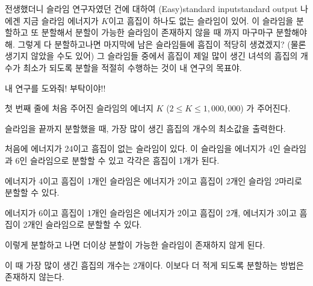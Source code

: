 \begin{problem}{전생했더니 슬라임 연구자였던 건에 대하여 (Easy)}{standard input}{standard output}
나에겐 지금 슬라임 에너지가 $K$이고 흠집이 하나도 없는 슬라임이 있어.
이 슬라임을 분할하고 또 분할해서 분할이 가능한 슬라임이 존재하지 않을 때 까지 마구마구 분할해야해.
그렇게 다 분할하고나면 마지막에 남은 슬라임들에 흠집이 적당히 생겼겠지?
(물론 생기지 않았을 수도 있어)
그 슬라임들 중에서 흠집이 제일 많이 생긴 녀석의 흠집의 개수가 최소가 되도록
분할을 적절히 수행하는 것이 내 연구의 목표야.

내 연구를 도와줘! 부탁이야!!

\InputFile
첫 번째 줄에 처음 주어진 슬라임의 에너지 $K$ ($2 \le K \le 1,000,000$) 가 주어진다.

\OutputFile
슬라임을 끝까지 분할했을 때, 가장 많이 생긴 흠집의 개수의 최소값을 출력한다.

\Example

\begin{example}
%
%
%
\end{example}

\Notes
처음에 에너지가 24이고 흠집이 없는 슬라임이 있다.
이 슬라임을 에너지가 4인 슬라임과 6인 슬라임으로 분할할 수 있고 각각은 흠집이 1개가 된다.

에너지가 4이고 흠집이 1개인 슬라임은 에너지가 2이고 흠집이 2개인 슬라임 2마리로 분할할 수 있다.

에너지가 6이고 흠집이 1개인 슬라임은 에너지가 2이고 흠집이 2개, 에너지가 3이고 흠집이 2개인 슬라임으로 분할할 수 있다.

이렇게 분할하고 나면 더이상 분할이 가능한 슬라임이 존재하지 않게 된다.

이 때 가장 많이 생긴 흠집의 개수는 2개이다. 이보다 더 적게 되도록 분할하는 방법은 존재하지 않는다.

\end{problem}
